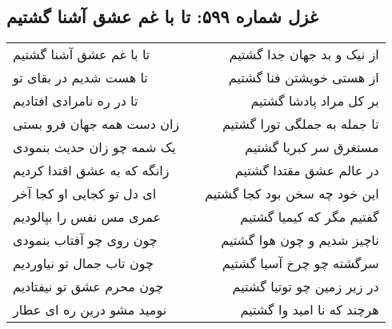 \begin{center}
\section*{غزل شماره ۵۹۹: تا با غم عشق آشنا گشتیم}
\label{sec:599}
\begin{longtable}{l p{0.5cm} r}
تا با غم عشق آشنا گشتیم
&&
از نیک و بد جهان جدا گشتیم
\\
تا هست شدیم در بقای تو
&&
از هستی خویشتن فنا گشتیم
\\
تا در ره نامرادی افتادیم
&&
بر کل مراد پادشا گشتیم
\\
زان دست همه جهان فرو بستی
&&
تا جمله به جملگی تورا گشتیم
\\
یک شمه چو زان حدیث بنمودی
&&
مستغرق سر کبریا گشتیم
\\
زانگه که به عشق اقتدا کردیم
&&
در عالم عشق مقتدا گشتیم
\\
ای دل تو کجایی او کجا آخر
&&
این خود چه سخن بود کجا گشتیم
\\
عمری مس نفس را بپالودیم
&&
گفتیم مگر که کیمیا گشتیم
\\
چون روی چو آفتاب بنمودی
&&
ناچیز شدیم و چون هوا گشتیم
\\
چون تاب جمال تو نیاوردیم
&&
سرگشته چو چرخ آسیا گشتیم
\\
چون محرم عشق تو نیفتادیم
&&
در زیر زمین چو توتیا گشتیم
\\
نومید مشو درین ره ای عطار
&&
هرچند که نا امید وا گشتیم
\\
\end{longtable}
\end{center}
